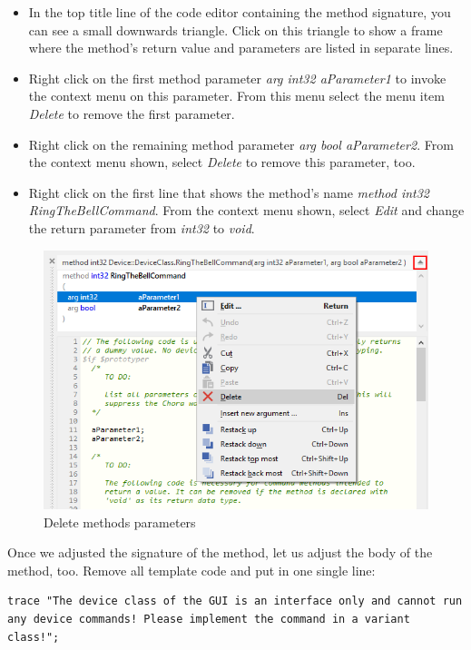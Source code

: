 \documentclass[
  a4paper,
,tablecaptionabove
]{scrbook}
\begin{document}
\begin{itemize}
\item
  In the top title line of the code editor containing the method
  signature, you can see a small downwards triangle. Click on this
  triangle to show a frame where the method's return value and
  parameters are listed in separate lines.
\item
  Right click on the first method parameter \emph{arg int32 aParameter1}
  to invoke the context menu on this parameter. From this menu select
  the menu item \emph{Delete} to remove the first parameter.
\item
  Right click on the remaining method parameter \emph{arg bool
  aParameter2}. From the context menu shown, select \emph{Delete} to
  remove this parameter, too.
\item
  Right click on the first line that shows the method's name
  \emph{method int32 RingTheBellCommand}. From the context menu shown,
  select \emph{Edit} and change the return parameter from \emph{int32}
  to \emph{void}.
\end{itemize}

\begin{figure}
\centering
\includegraphics{./../asciidoc/modules/ROOT/assets/images/deviceintegration/DeleteMethodParameters.png}
\caption{Delete methods parameters}
\end{figure}

Once we adjusted the signature of the method, let us adjust the body of
the method, too. Remove all template code and put in one single line:

\begin{verbatim}
trace "The device class of the GUI is an interface only and cannot run any device commands! Please implement the command in a variant class!";
\end{verbatim}
\end{document}
